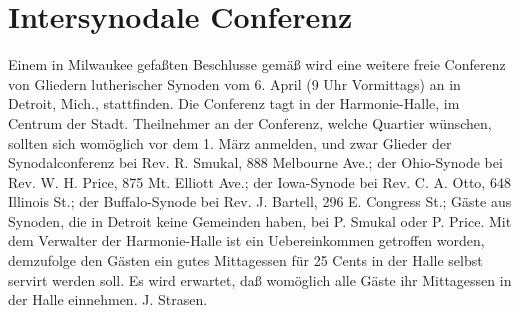 \chapter{Intersynodale Conferenz}

Einem in Milwaukee gefaßten Beschlusse gemäß wird eine weitere freie Conferenz von Gliedern lutherischer Synoden vom 6. April (9 Uhr Vormittags) an in Detroit, Mich., stattfinden. Die Conferenz tagt in der Harmonie-Halle, im Centrum der Stadt. Theilnehmer an der Conferenz, welche Quartier wünschen, sollten sich womöglich vor dem 1. März anmelden, und zwar Glieder der Synodalconferenz bei Rev. R. Smukal, 888 Melbourne Ave.; der Ohio-Synode bei Rev. W. H. Price, 875 Mt. Elliott Ave.; der Iowa-Synode bei Rev. C. A. Otto, 648 Illinois St.; der Buffalo-Synode bei Rev. J. Bartell, 296 E. Congress St.; Gäste aus Synoden, die in Detroit keine Gemeinden haben, bei P. Smukal oder P. Price. Mit dem Verwalter der Harmonie-Halle ist ein Uebereinkommen getroffen worden, demzufolge den Gästen ein gutes Mittagessen für 25 Cents in der Halle selbst servirt werden soll. Es wird erwartet, daß womöglich alle Gäste ihr Mittagessen in der Halle einnehmen. J. Strasen.
